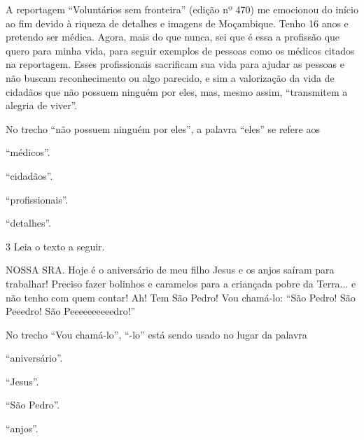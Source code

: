 \begin{myquote}
A reportagem ``Voluntários sem fronteira'' (edição nº 470) me emocionou
do início ao fim devido à riqueza de detalhes e imagens de Moçambique.
Tenho 16 anos e pretendo ser médica. Agora, mais do que nunca, sei que é
essa a profissão que quero para minha vida, para seguir exemplos de
pessoas como os médicos citados na reportagem. Esses profissionais
sacrificam sua vida para ajudar as pessoas e não buscam reconhecimento
ou algo parecido, e sim a valorização da vida de cidadãos que não
possuem ninguém por eles, mas, mesmo assim, ``transmitem a alegria de
viver''.

\end{myquote}

No trecho ``não possuem ninguém por eles'', a palavra ``eles'' se refere
aos

\begin{escolha}
\item ``médicos''.

\item ``cidadãos''.

\item ``profissionais''.

\item ``detalhes''.
\end{escolha}

\num{3} Leia o texto a seguir.

\begin{myquote}
NOSSA SRA. Hoje é o aniversário de meu filho Jesus e os anjos saíram
para trabalhar! Preciso fazer bolinhos e caramelos para a criançada pobre da
Terra... e não tenho com quem contar! Ah! Tem São Pedro! Vou chamá-lo: “São
Pedro! São Peeedro! São Peeeeeeeeeedro!” 

\end{myquote}

No trecho ``Vou chamá-lo'', ``-lo'' está sendo usado no lugar da palavra

\begin{escolha}
\item ``aniversário''.

\item ``Jesus''.

\item ``São Pedro''.

\item ``anjos''.
\end{escolha}


